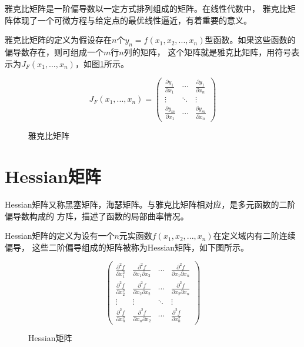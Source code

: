 雅克比矩阵是一阶偏导数以一定方式排列组成的矩阵。在线性代数中，
雅克比矩阵体现了一个可微方程与给定点的最优线性逼近，有着重要的意义。

雅克比矩阵的定义为假设存在$n$个$y_n=f(x_1,x_2,...,x_n)$型函数。如果这些函数的偏导数存在，则可组成一个$m$行$n$列的矩阵，
这个矩阵就是雅克比矩阵，用符号表示为$J_F(x_1,...,x_n)$，如图\ref{jacobin_matrix}所示。

\begin{figure}[!hb]
	\begin{equation}
		J_F(x_1,...,x_n)=
		\left( \begin{matrix}
			\frac{\partial y_1}{\partial x_1} & \cdots & \frac{\partial y_1}{\partial x_n}\\
			\vdots & \ddots & \vdots\\
			\frac{\partial y_m}{\partial x_1} & \cdots & \frac{\partial y_m}{\partial x_n}
			\end{matrix}
			\right )
	\end{equation}
	\caption{雅克比矩阵}
	\label{jacobin_matrix}
\end{figure}



\section{Hessian矩阵}

Hessian矩阵又称黑塞矩阵，海瑟矩阵。与雅克比矩阵相对应，是多元函数的二阶偏导数构成的
方阵，描述了函数的局部曲率情况。

Hessian矩阵的定义为设有一个$n$元实函数$f(x_1,x_2,...,x_n)$在定义域内有二阶连续偏导，
这些二阶偏导组成的矩阵被称为Hessian矩阵，如下图所示。

\begin{figure}[!h]
	\begin{equation}
		\left( \begin{matrix}
			\frac{\partial^2 f}{\partial x_1^2} & \frac{\partial^2 f}{\partial x_1 \partial x_2} & \cdots & \frac{\partial^2 f}{\partial x_1 \partial x_n}\\
            \frac{\partial^2 f}{\partial x_2^2} & \frac{\partial^2 f}{\partial x_2 \partial x_2} & \cdots & \frac{\partial^2 f}{\partial x_2 \partial x_n}\\
			\vdots & \vdots & \ddots & \vdots\\
			\frac{\partial^2 f}{\partial x_n^2} & \frac{\partial^2 f}{\partial x_n \partial x_2} & \cdots & \frac{\partial^2 f}{\partial x_n^2}
			\end{matrix}
			\right )
	\end{equation}
	\caption{Hessian矩阵}
\end{figure}


